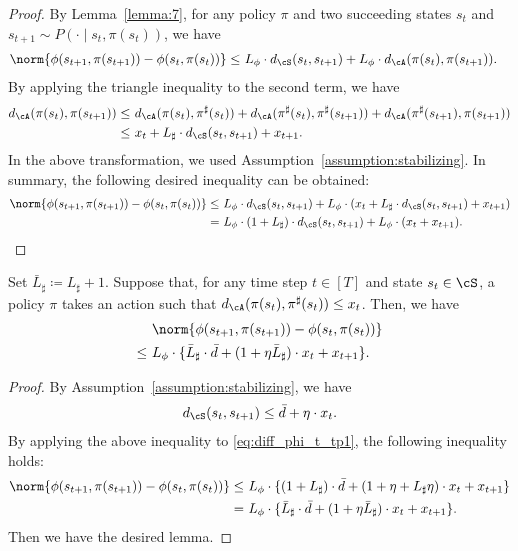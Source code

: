 \smallskip
\begin{proof}
    By Lemma~\ref{lemma:7}, for any policy $\pi$ and two succeeding states $s_t$ and $s_{t+1} \sim P(\cdot \mid s_t, \pi(s_t))$, we have
    \begin{align*}
        \norm{\phi(s_{t+1}, \pi(s_{t+1})) - \phi(s_t, \pi(s_t))}
        \le &\ L_\phi \cdot d_\cS(s_t, s_{t+1}) + L_\phi \cdot d_\cA(\pi(s_t), \pi(s_{t+1})).
    \end{align*}
    By applying the triangle inequality to the second term, we have
    \begin{align*}
        d_\cA(\pi(s_t), \pi(s_{t+1}))
        \le &\ d_\cA(\pi(s_t), \pi^\sharp(s_t)) + d_\cA(\pi^\sharp(s_t), \pi^\sharp(s_{t+1})) + d_\cA(\pi^\sharp(s_{t+1}), \pi(s_{t+1})) \\
        \le &\ x_t + L_\sharp \cdot d_\cS(s_t, s_{t+1}) + x_{t+1}.
    \end{align*}
    In the above transformation, we used Assumption~\ref{assumption:stabilizing}.
    In summary, the following desired inequality can be obtained:
    \begin{align*}
        \norm{\phi(s_{t+1}, \pi(s_{t+1})) - \phi(s_t, \pi(s_t))}
        \le &\ L_\phi \cdot d_\cS(s_t, s_{t+1}) + L_\phi \cdot \left( x_t + L_\sharp \cdot d_\cS(s_t, s_{t+1}) + x_{t+1} \right) \\
        = &\ L_\phi \cdot (1 + L_\sharp) \cdot d_\cS(s_t, s_{t+1}) + L_\phi \cdot  (x_t + x_{t+1}).
    \end{align*}
\end{proof}

\begin{lemma}
    \label{lemma:diff_phi}
    Set $\bar{L}_\sharp \coloneqq L_\sharp + 1$.
    Suppose that, for any time step $t \in [T]$ and state $s_t \in \cS$, a policy $\pi$ takes an action such that $d_\cA(\pi(s_t), \pi^\sharp(s_t)) \le x_t$.
    Then, we have
    \begin{align*}
        &\ \norm{\phi(s_{t+1}, \pi(s_{t+1})) - \phi(s_t, \pi(s_t))} \\
        \le &\ L_\phi \cdot \{\bar{L}_\sharp \cdot \bar{d} + (1 + \eta \bar{L}_\sharp) \cdot x_t + x_{t+1}\}.
    \end{align*}
\end{lemma}

\begin{proof}
    By Assumption~\ref{assumption:stabilizing}, we have
    \begin{align*}
        d_\cS(s_t, s_{t+1}) \le \bar{d} + \eta \cdot x_t.
    \end{align*}
    By applying the above inequality to \eqref{eq:diff_phi_t_tp1}, the following inequality holds:
    \begin{align*}
        \norm{\phi(s_{t+1}, \pi(s_{t+1})) - \phi(s_t, \pi(s_t))}
        \le &\ L_\phi \cdot \{(1 + L_\sharp) \cdot \bar{d} + (1 + \eta + L_\sharp \eta) \cdot x_t + x_{t+1}\} \\
        = &\ L_\phi \cdot \{\bar{L}_\sharp \cdot \bar{d} + (1 + \eta \bar{L}_\sharp) \cdot x_t + x_{t+1}\}.
    \end{align*}
    Then we have the desired lemma.
\end{proof}

